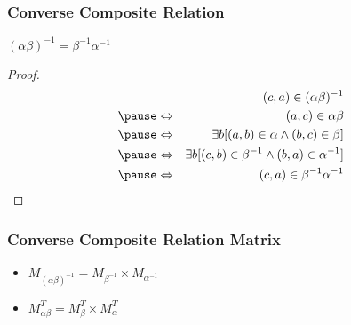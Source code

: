 \documentclass[dvipsnames]{beamer}
\begin{document}
\begin{frame}
  \frametitle{Converse Composite Relation}

  \begin{theorem}
    $(\alpha \beta)^{-1} = \beta^{-1} \alpha^{-1}$
  \end{theorem}

  \pause
  \begin{proof}
    \begin{eqnarray*}
      &                 & (c,a) \in (\alpha \beta)^{-1}\\\pause
      & \Leftrightarrow & (a,c) \in \alpha \beta\\\pause
      & \Leftrightarrow & \exists b [(a,b) \in \alpha
                              \wedge (b,c) \in \beta]\\\pause
      & \Leftrightarrow & \exists b [(c,b) \in \beta^{-1}
                              \wedge (b,a) \in \alpha^{-1}]\\\pause
      & \Leftrightarrow & (c,a) \in \beta^{-1}\alpha^{-1}
    \end{eqnarray*}
  \end{proof}
\end{frame}

\begin{frame}
  \frametitle{Converse Composite Relation Matrix}

  \begin{itemize}
    \item $M_{(\alpha \beta)^{-1}} = M_{\beta^{-1}} \times M_{\alpha^{-1}}$
    \item $M_{\alpha \beta}^{T} = M_{\beta}^{T} \times M_{\alpha}^{T}$
  \end{itemize}
\end{frame}
\end{document}

